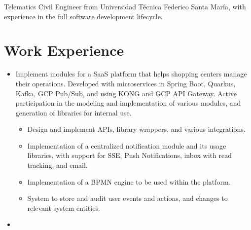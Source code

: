 \documentclass[11pt,letterpaper,sans]{moderncv}        %
\begin{document}
\makecvtitle

\small{Telematics Civil Engineer from Universidad Técnica Federico Santa María, with experience in the full software development lifecycle.}


\section{Work Experience}

\vspace{4pt}

\begin{itemize}

\item{
{\vspace{3pt}
Implement modules for a SaaS platform that helps shopping centers manage their operations. Developed with microservices in Spring Boot, Quarkus, Kafka, GCP Pub/Sub, and using KONG and GCP API Gateway. Active participation in the modeling and implementation of various modules, and generation of libraries for internal use.
\begin{itemize}
\item Design and implement APIs, library wrappers, and various integrations.
\item Implementation of a centralized notification module and its usage libraries, with support for SSE, Push Notifications, inbox with read tracking, and email.
\item Implementation of a BPMN engine to be used within the platform.
\item System to store and audit user events and actions, and changes to relevant system entities.
\end{itemize}
}}

\vspace{6pt}

\item{}


\end{itemize}
\end{document}
